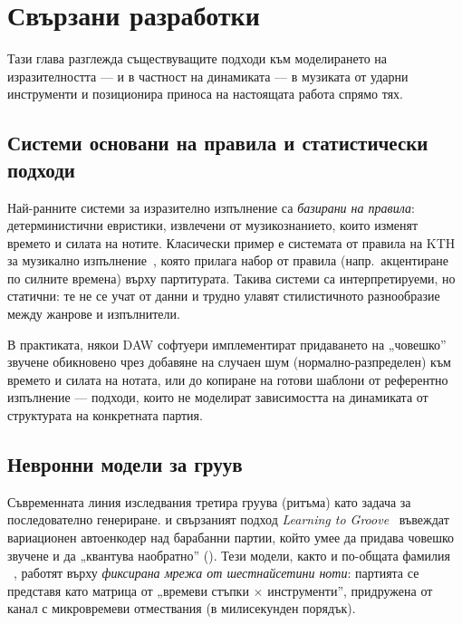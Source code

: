 \chapter{Свързани разработки}
\label{ch:svarzani}

Тази глава разглежда съществуващите подходи към моделирането на изразителността —
и в частност на динамиката — в музиката от ударни инструменти и позиционира приноса на
настоящата работа спрямо тях.

\section{Системи основани на правила и статистически подходи}
\label{sec:svarzani-pravila}

Най-ранните системи за изразително изпълнение са \emph{базирани на правила}:
детерминистични евристики, извлечени от музикознанието, които изменят времето и
силата на нотите. Класически пример е системата от правила на KTH за музикално
изпълнение~\cite{friberg2006overview}, която прилага набор от правила (напр.\
акцентиране по силните времена) върху партитурата. Такива системи са
интерпретируеми, но статични: те не се учат от данни и трудно улавят
стилистичното разнообразие между жанрове и изпълнители.

В практиката, някои DAW софтуери имплементират
придаването на „човешко'' звучене обикновено чрез добавяне на
случаен шум (нормално-разпределен) към времето и силата на нотата, или до копиране на готови
шаблони от референтно изпълнение — подходи, които не моделират зависимостта на динамиката от
структурата на конкретната партия.

\section{Невронни модели за груув}
\label{sec:svarzani-nevronni}

Съвременната линия изследвания третира груува (ритъма) като задача за
последователно генериране. \eng{GrooVAE} и свързаният подход
\emph{Learning to Groove}~\cite{gillick2019groove} въвеждат вариационен
автоенкодер над барабанни партии, който умее да придава човешко звучене и да
„квантува наобратно'' (\eng{groove transfer}). Тези модели, както и по-общата фамилия
\eng{MusicVAE}~\cite{roberts2018musicvae}, работят върху \emph{фиксирана мрежа
от шестнайсетини ноти}: партията се представя като матрица от „времеви стъпки
$\times$ инструменти'', придружена от канал с микровремеви отмествания (в милисекунден порядък).

